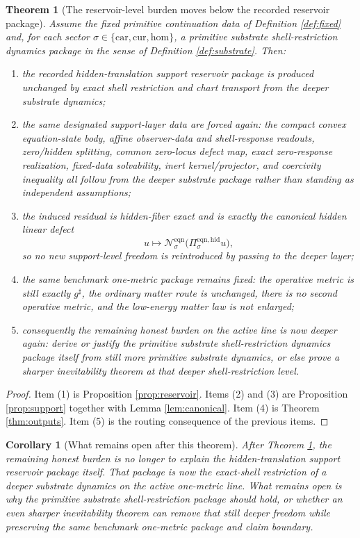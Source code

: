 \documentclass[11pt]{article}
\newcommand{\CompletedMetric}{g^{\sharp}}
\newcommand{\Car}{\mathrm{car}}
\newcommand{\Cur}{\mathrm{cur}}
\newcommand{\Hom}{\mathrm{hom}}
\newcommand{\EqnProj}[1]{\Pi_{#1}^{\mathrm{eqn,hid}}}
\newcommand{\EqnLin}[1]{\mathcal N_{#1}^{\mathrm{eqn}}}
\newtheorem{corollary}{Corollary}
\newtheorem{theorem}{Theorem}
\begin{document}
\begin{theorem}[The reservoir-level burden moves below the recorded reservoir package]
\label{thm:main}
Assume the fixed primitive continuation data of Definition \ref{def:fixed} and, for each sector \(\sigma\in\{\Car,\Cur,\Hom\}\), a primitive substrate shell-restriction dynamics package in the sense of Definition \ref{def:substrate}. Then:
\begin{enumerate}
    \item the recorded hidden-translation support reservoir package is produced unchanged by exact shell restriction and chart transport from the deeper substrate dynamics;
    \item the same designated support-layer data are forced again: the compact convex equation-state body, affine observer-data and shell-response readouts, zero/hidden splitting, common zero-locus defect map, exact zero-response realization, fixed-data solvability, inert kernel/projector, and coercivity inequality all follow from the deeper substrate package rather than standing as independent assumptions;
    \item the induced residual is hidden-fiber exact and is exactly the canonical hidden linear defect
    \[
    u\mapsto \EqnLin{\sigma}\bigl(\EqnProj{\sigma}u\bigr),
    \]
    so no new support-level freedom is reintroduced by passing to the deeper layer;
    \item the same benchmark one-metric package remains fixed: the operative metric is still exactly \(\CompletedMetric\), the ordinary matter route is unchanged, there is no second operative metric, and the low-energy matter law is not enlarged;
    \item consequently the remaining honest burden on the active line is now deeper again: derive or justify the primitive substrate shell-restriction dynamics package itself from still more primitive substrate dynamics, or else prove a sharper inevitability theorem at that deeper shell-restriction level.
\end{enumerate}
\end{theorem}

\begin{proof}
Item (1) is Proposition \ref{prop:reservoir}. Items (2) and (3) are Proposition \ref{prop:support} together with Lemma \ref{lem:canonical}. Item (4) is Theorem \ref{thm:outputs}. Item (5) is the routing consequence of the previous items.
\end{proof}

\begin{corollary}[What remains open after this theorem]
\label{cor:next}
After Theorem \ref{thm:main}, the remaining honest burden is no longer to explain the hidden-translation support reservoir package itself. That package is now the exact-shell restriction of a deeper substrate dynamics on the active one-metric line. What remains open is why the primitive substrate shell-restriction package should hold, or whether an even sharper inevitability theorem can remove that still deeper freedom while preserving the same benchmark one-metric package and claim boundary.
\end{corollary}
\end{document}
